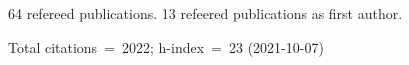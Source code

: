 64 refereed publications. 13 refeered publications as first author.

Total citations~=~2022; h-index~=~23 (2021-10-07)
